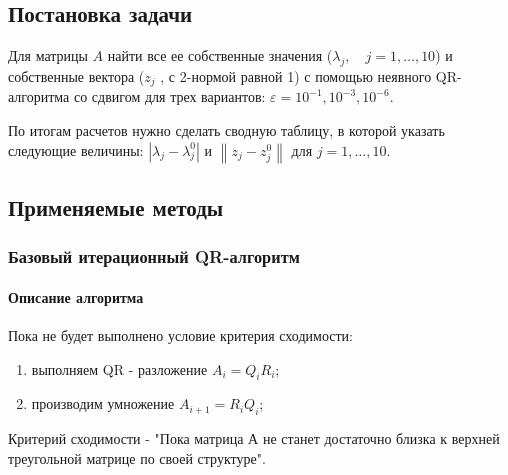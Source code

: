 \documentclass[a4paper]{article}
\begin{document}
\subsection{Постановка задачи}

Для матрицы $A$ найти все ее собственные значения ($\lambda_j, \quad j = 1,\ldots, 10$) и собственные вектора ($z_j$ , с 2-нормой равной 1) с помощью неявного QR-алгоритма со сдвигом для трех вариантов: $\varepsilon = 10^{-1}, 10^{-3}, 10^{-6}$. 

По итогам расчетов нужно сделать сводную таблицу, в которой указать следующие величины: $\left | \lambda_j - \lambda_j^{0}  \right |$ и $\left \| z_j - z_j^{0} \right \|$  для $j = 1,\ldots,10$.

\newpage

\subsection{Применяемые методы}

\subsubsection{Базовый итерационный QR-алгоритм}

\paragraph{Описание алгоритма}

Пока не будет выполнено условие критерия сходимости:
\begin{enumerate}
\item выполняем QR - разложение $A_i = Q_i R_i$;
\item производим умножение $A_{i+1} = R_i Q_i$;
\end{enumerate}

Критерий сходимости - "Пока матрица А не станет достаточно близка к верхней треугольной матрице по своей структуре".



\newpage
\end{document}
